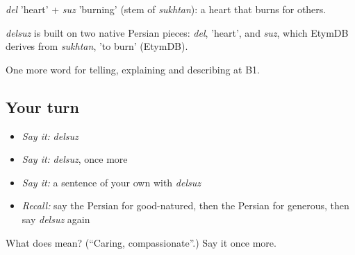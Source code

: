 \emph{del} 'heart' + \emph{suz} 'burning' (stem of \emph{sukhtan}): a heart that burns for others.

\begin{cousinweb}
\emph{delsuz} is built on two native Persian pieces: \emph{del}, 'heart', and \emph{suz}, which EtymDB derives from \emph{sukhtan}, 'to burn' (EtymDB).
\end{cousinweb}

\begin{grammarlens}[title={What you've built}]
One more word for telling, explaining and describing at B1.
\end{grammarlens}

\subsection*{Your turn}
\begin{itemize}
\raggedright
  \item \emph{Say it:} \emph{delsuz}
  \item \emph{Say it:} \emph{delsuz}, once more
  \item \emph{Say it:} a sentence of your own with \emph{delsuz}
  \item \emph{Recall:} say the Persian for good-natured, then the Persian for generous, then say \emph{delsuz} again
\end{itemize}

\begin{tcolorbox}[breakable,colback=teal!4,colframe=teal!35!black,title={Before you move on}]
What does  mean? (\textquotedblleft{}Caring, compassionate\textquotedblright{}.) Say it once more.
\end{tcolorbox}
